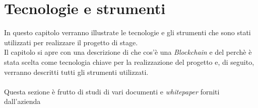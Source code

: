 
\chapter{Tecnologie e strumenti}
\label{cap:tecnologie_e_strumenti}
In questo capitolo verranno illustrate le tecnologie e gli strumenti che sono stati utilizzati per realizzare il progetto di stage.\\
Il capitolo si apre con una descrizione di che cos'è una \textit{Blockchain} e del perchè è stata scelta come tecnologia chiave per la realizzazione del progetto e, di seguito, verranno descritti tutti gli strumenti utilizzati.\\\\
Questa sezione è frutto di studi di vari documenti e \textit{whitepaper} forniti dall'azienda\cite{spidchain_whitepaper}\cite{SSID}\cite{jolocom_whitepaper}\cite{ITF_gartner}\cite{hashgraph_whitepaper}
